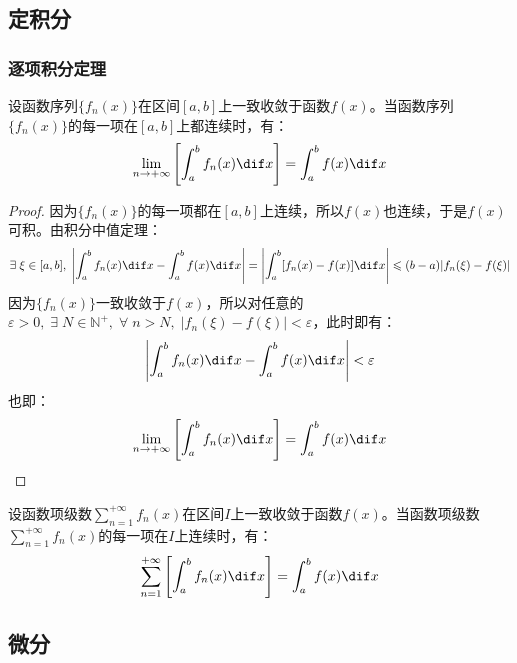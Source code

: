 \subsection{定积分}
\subsubsection{逐项积分定理}
\begin{theorem}
	设函数序列$\{f_n(x)\}$在区间$[a,b]$上一致收敛于函数$f(x)$。当函数序列$\{f_n(x)\}$的每一项在$[a,b]$上都连续时，有：
	\begin{equation*}
		\lim_{n\to+\infty}\left[\int_{a}^{b}f_n(x)\dif x\right]=\int_{a}^{b}f(x)\dif x
	\end{equation*}
\end{theorem}
\begin{proof}
	因为$\{f_n(x)\}$的每一项都在$[a,b]$上连续，所以$f(x)$也连续，于是$f(x)$可积。由积分中值定理：
	\begin{equation*}
		\exists\;\xi\in[a,b],\;\left|\int_{a}^{b}f_n(x)\dif x-\int_{a}^{b}f(x)\dif x\right|=\left|\int_{a}^{b}[f_n(x)-f(x)]\dif x\right|\leqslant(b-a)|f_n(\xi)-f(\xi)|
	\end{equation*}
	因为$\{f_n(x)\}$一致收敛于$f(x)$，所以对任意的$\varepsilon>0,\;\exists\;N\in\mathbb{N}^+,\;\forall\;n>N,\;|f_n(\xi)-f(\xi)|<\varepsilon$，此时即有：
	\begin{equation*}
		\left|\int_{a}^{b}f_n(x)\dif x-\int_{a}^{b}f(x)\dif x\right|<\varepsilon
	\end{equation*}
	也即：
	\begin{equation*}
		\lim_{n\to+\infty}\left[\int_{a}^{b}f_n(x)\dif x\right]=\int_{a}^{b}f(x)\dif x
	\end{equation*}
\end{proof}
\begin{theorem}
	设函数项级数$\sum\limits_{n=1}^{+\infty}f_n(x)$在区间$I$上一致收敛于函数$f(x)$。当函数项级数$\sum\limits_{n=1}^{+\infty}f_n(x)$的每一项在$I$上连续时，有：
	\begin{equation*}
		\sum_{n=1}^{+\infty}\left[\int_{a}^{b}f_n(x)\dif x\right]=\int_{a}^{b}f(x)\dif x
	\end{equation*}
\end{theorem}

\subsection{微分}

